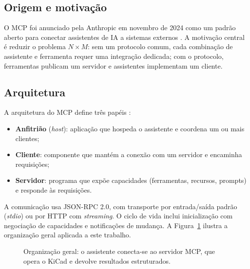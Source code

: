 \subsection{Origem e motivação}

O MCP foi anunciado pela Anthropic em novembro de 2024 como um padrão aberto
para conectar assistentes de IA a sistemas externos \citep{anthropic2024mcp}.
A motivação central é reduzir o problema $N \times M$: sem um protocolo comum,
cada combinação de assistente e ferramenta requer uma integração dedicada;
com o protocolo, ferramentas publicam um servidor e assistentes implementam um
cliente.

\subsection{Arquitetura}

A arquitetura do MCP define três papéis \citep{mcp2025spec}:

\begin{itemize}[leftmargin=1.4em,itemsep=0.2em]
  \item \textbf{Anfitrião} (\emph{host}): aplicação que hospeda o assistente e
        coordena um ou mais clientes;
  \item \textbf{Cliente}: componente que mantém a conexão com um servidor e
        encaminha requisições;
  \item \textbf{Servidor}: programa que expõe capacidades (ferramentas,
        recursos, prompts) e responde às requisições.
\end{itemize}

A comunicação usa JSON-RPC 2.0, com transporte por entrada/saída padrão
(\emph{stdio}) ou por HTTP com \emph{streaming}. O ciclo de vida inclui
inicialização com negociação de capacidades e notificações de mudança. A
Figura~\ref{fig:mcp-geral} ilustra a organização geral aplicada a este
trabalho.

\begin{figure}[htbp]
\centering
{}
\caption{Organização geral: o assistente conecta-se ao servidor MCP, que opera
o KiCad e devolve resultados estruturados.}
\label{fig:mcp-geral}
\end{figure}

